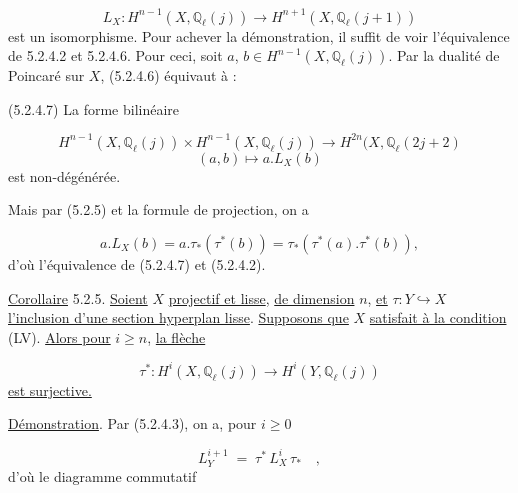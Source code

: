\begin{equation}\tag{5.2.4.6}
L_X : H^{n-1}(X,\mathbb{Q}_\ell(j)) \longrightarrow H^{n+1}(X,\mathbb{Q}_\ell(j+1))
\end{equation}
est un isomorphisme. Pour achever la démonstration, il suffit de voir l'équivalence de 5.2.4.2 et 5.2.4.6. Pour ceci, soit $a$, $b \in H^{n-1}(X,\mathbb{Q}_\ell(j))$. Par la dualité de Poincaré sur $X$, (5.2.4.6) équivaut à :

(5.2.4.7) La forme bilinéaire

\begin{equation*}
H^{n-1}(X,\mathbb{Q}_\ell(j))\times H^{n-1}(X,\mathbb{Q}_\ell(j)) \longrightarrow H^{2n}(X,\mathbb{Q}_\ell(2j+2)
\end{equation*}
\begin{equation*}
(a,b) \longmapsto a.L_X(b)
\end{equation*}
est non-dégénérée.



Mais par (5.2.5) et la formule de projection, on a

\begin{equation*}
a.L_X(b) = a.\tau_*(\tau^*(b)) = \tau_*(\tau^*(a).\tau^*(b)),
\end{equation*}
d'où l'équivalence de (5.2.4.7) et (5.2.4.2).

\underline{Corollaire} 5.2.5. \underline{Soient} $X$ \underline{projectif et lisse}, \underline{de dimension} $n$, \underline{et} $\tau : Y \hookrightarrow X$ \underline{l'inclusion d'une section hyperplan lisse}. \underline{Supposons que} $X$ \underline{satisfait à la condition} (LV). \underline{Alors pour} $i \geq n$, \underline{la flèche}

\begin{equation*}
\tau^* : H^i(X,\mathbb{Q}_\ell(j)) \longrightarrow H^i(Y,\mathbb{Q}_\ell(j))
\end{equation*}
\underline{est surjective.}

\underline{Démonstration}. Par (5.2.4.3), on a, pour $i \geq 0$

\begin{equation*}
L_Y^{i+1} \;=\; \tau^* \, L_X^i \, \tau_* \quad ,
\end{equation*}
d'où le diagramme commutatif

